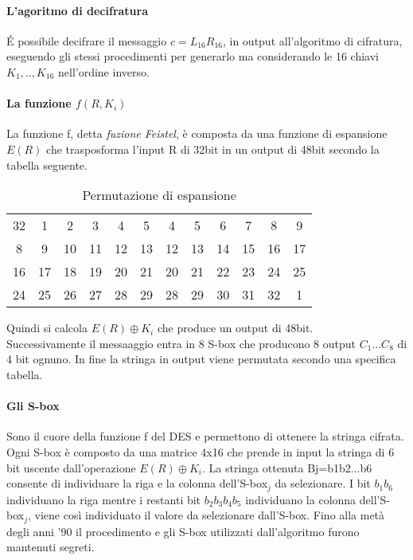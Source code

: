 \documentclass[11pt, a4paper, oneside]{Thesis} %
\begin{document}
\paragraph{L'agoritmo di decifratura}
\'E possibile decifrare il messaggio $c=L_{16}R_{16}$, in output all'algoritmo di cifratura, eseguendo gli stessi procedimenti per generarlo ma considerando le 
16 chiavi $K_1,..,K_{16}$ nell'ordine inverso. 

\paragraph{La funzione $f(R, K_i)$}La funzione f, detta \emph{fuzione Feistel}, è composta da una funzione di espansione $E(R)$ che trasposforma l'input R di 32bit in un output di 48bit secondo la tabella 
seguente.
\begin{table}[ht] 
\caption{Permutazione di espansione} %
\centering %
\begin{tabular}{c c c c c c c c c c c c} %
\hline %
32 & 1 & 2 & 3 & 4 & 5 & 4 & 5 & 6 & 7 & 8 & 9\\
8 & 9 & 10 & 11 & 12 & 13 & 12 & 13 & 14 & 15 & 16 & 17\\
16 & 17 & 18 & 19 & 20 & 21 & 20 & 21 & 22 & 23 & 24 & 25\\
24 & 25 & 26 & 27 & 28 & 29 & 28 & 29 & 30 & 31 & 32 & 1\\
\hline %
\end{tabular} 
\label{table:tabExpR} %
\end{table}
Quindi si calcola $E(R) \oplus K_i$ che produce un output di 48bit.
\\Successivamente il messaaggio entra in 8 S-box che producono 8 output $C_1...C_8$ di 4 bit ognuno.
In fine la stringa in output viene permutata secondo una specifica tabella.

\paragraph{Gli S-box}Sono il cuore della funzione f del DES e permettono di ottenere la stringa cifrata.
Ogni S-box è composto da una matrice 4x16 che prende in input la stringa di 6 bit uscente dall'operazione $E(R) \oplus K_i$.
La stringa ottenuta Bj=b1b2...b6 consente di individuare la riga e la colonna dell'S-box$_j$ da selezionare. 
I bit $b_1 b_6$ individuano la riga mentre i restanti bit $b_2 b_3 b_4 b_5$ individuano la colonna dell'S-box$_j$, viene così individuato il valore da selezionare dall'S-box.
Fino alla metà degli anni '90 il procedimento e gli S-box utilizzati dall'algoritmo furono mantenuti segreti.
\end{document}
